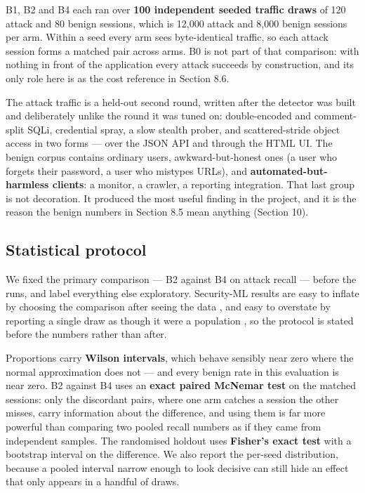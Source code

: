 B1, B2 and B4 each ran over \textbf{100 independent seeded traffic draws} of 120 attack
and 80 benign sessions, which is 12,000 attack and 8,000 benign sessions per arm.
Within a seed every arm sees byte-identical traffic, so each attack session forms a
matched pair across arms. B0 is not part of that comparison: with nothing in front
of the application every attack succeeds by construction, and its only role here is
as the cost reference in Section 8.6.

The attack traffic is a held-out second round, written after the detector was built
and deliberately unlike the round it was tuned on: double-encoded and
comment-split SQLi, credential spray, a slow stealth prober, and scattered-stride
object access in two forms --- over the JSON API and through the HTML UI. The benign
corpus contains ordinary users, awkward-but-honest ones (a user who forgets their
password, a user who mistypes URLs), and \textbf{automated-but-harmless clients}: a
monitor, a crawler, a reporting integration. That last group is not decoration. It
produced the most useful finding in the project, and it is the reason the benign
numbers in Section 8.5 mean anything (Section 10).


\subsection{Statistical protocol}

We fixed the primary comparison --- B2 against B4 on attack recall --- before the runs,
and label everything else exploratory. Security-ML results are easy to inflate by
choosing the comparison after seeing the data \cite{arp2022dos}, and easy to
overstate by reporting a single draw as though it were a population
\cite{sommer2010outside}, so the protocol is stated before the numbers rather than
after.

Proportions carry \textbf{Wilson intervals}, which behave sensibly near zero where the
normal approximation does not --- and every benign rate in this evaluation is near
zero. B2 against B4 uses an \textbf{exact paired McNemar test} on the matched sessions:
only the discordant pairs, where one arm catches a session the other misses, carry
information about the difference, and using them is far more powerful than
comparing two pooled recall numbers as if they came from independent samples. The
randomised holdout uses \textbf{Fisher's exact test} with a bootstrap interval on the
difference. We also report the per-seed distribution, because a pooled interval
narrow enough to look decisive can still hide an effect that only appears in a
handful of draws.



